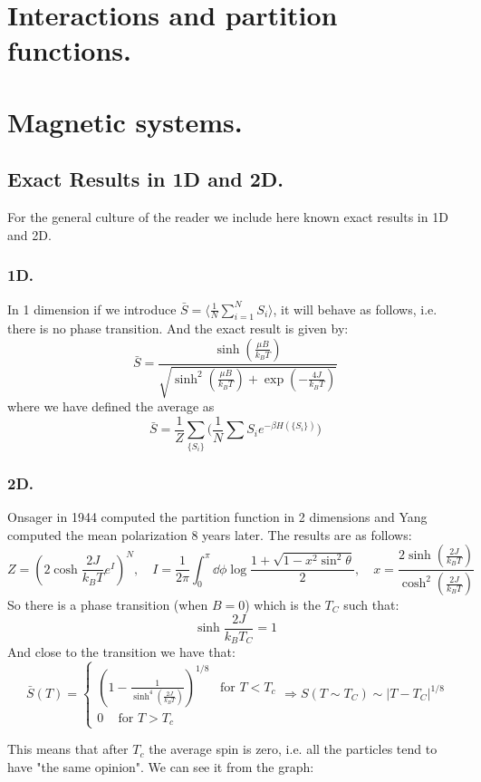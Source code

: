 \documentclass[10pt,a4paper]{book}
\begin{document}
\section{Interactions and partition functions.}
\section{Magnetic systems.}
\subsection{Exact Results in 1D and 2D.}
For the general culture of the reader we include here known exact results in 1D and 2D. 
\subsubsection{1D.}
In 1 dimension if we introduce $\bar{S} = \langle \frac{1}{N} \sum_{i = 1}^N S_i \rangle$, it will behave as follows, i.e. there is no phase transition. And the exact result is given by:
\[
\bar{S}  = \frac{\sinh(\frac{\mu B}{k_B T})}{\sqrt{\sinh^2(\frac{\mu B}{k_B T}) + \exp(-\frac{4J}{k_B T})}}
\]
where we have defined the average as 
$$\bar{S}=\frac{1}{Z}\sum_{\{S_i\}}\bigg(\frac{1}{N}\sum S_i e^{-\beta H(\{S_i\})}\bigg)$$

\subsubsection{2D.}
Onsager in 1944 computed the partition function in 2 dimensions and Yang computed the mean polarization 8 years later. The results are as follows:
\[
Z = \left(2 \cosh \frac{2 J}{k_B T} e^I \right)^N,\quad I = \frac{1}{2\pi} \int_0^\pi \dd \phi \log \frac{1 + \sqrt{1 - x^2 \sin^2 \theta}}{2}, \quad x = \frac{2 \sinh (\frac{2J}{k_B T})}{\cosh^2(\frac{2J}{k_B T})}
\]
So there is a phase transition (when $B = 0$) which is the $T_C$ such that:
\[
\sinh \frac{2J}{k_B T_C} = 1
\]
And close to the transition we have that:
\[
\bar{S}(T) =
\begin{cases} \left(1 - \frac{1}{\sinh^4(\frac{2J}{k_B T})}\right)^{1/8}\,\,\,\text{ for }T<T_c\\
0\,\,\,\,\,\text{ for }T>T_c
\end{cases} \Rightarrow S(T \sim T_C) \sim |T - T_C|^{1/8}
\]

This means that after $T_c$ the average spin is zero, i.e. all the particles tend to have "the same opinion".
We can see it from the graph:\\
\end{document}
